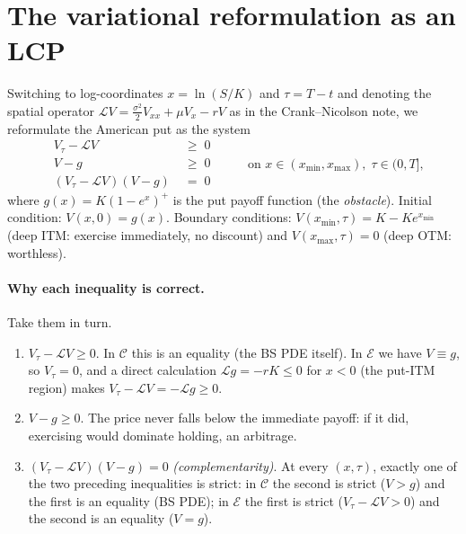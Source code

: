 \documentclass[11pt,a4paper]{article}
\begin{document}
\section{The variational reformulation as an LCP}

Switching to log-coordinates $x = \ln(S/K)$ and $\tau = T - t$ and
denoting the spatial operator
$\mathcal{L}V = \frac{\sigma^2}{2}V_{xx} + \mu V_x - rV$ as in
the Crank--Nicolson note, we reformulate the American put as the system
\begin{equation}
\boxed{\;\;\begin{aligned}
V_\tau - \mathcal{L}V \;&\geq\; 0 \\
V - g \;&\geq\; 0 \\
(V_\tau - \mathcal{L}V)(V - g) \;&=\; 0
\end{aligned}\;\;}
\qquad
\text{on } x \in (x_{\min}, x_{\max}),\; \tau \in (0, T],
\label{eq:lcp-cont}
\end{equation}
where $g(x) = K(1 - e^x)^+$ is the put payoff function (the
\emph{obstacle}). Initial condition: $V(x, 0) = g(x)$. Boundary
conditions: $V(x_{\min}, \tau) = K - K e^{x_{\min}}$ (deep ITM:
exercise immediately, no discount) and
$V(x_{\max}, \tau) = 0$ (deep OTM: worthless).

\paragraph{Why each inequality is correct.} Take them in turn.

\begin{enumerate}[leftmargin=2em]
\item $V_\tau - \mathcal{L}V \geq 0$. In $\mathcal{C}$ this is an
equality (the BS PDE itself). In $\mathcal{E}$ we have $V \equiv g$,
so $V_\tau = 0$, and a direct calculation
$\mathcal{L}g = -rK \leq 0$ for $x < 0$ (the put-ITM region) makes
$V_\tau - \mathcal{L}V = -\mathcal{L}g \geq 0$.

\item $V - g \geq 0$. The price never falls below the immediate
payoff: if it did, exercising would dominate holding, an arbitrage.

\item $(V_\tau - \mathcal{L}V)(V - g) = 0$ \emph{(complementarity)}.
At every $(x, \tau)$, exactly one of the two preceding inequalities
is strict: in $\mathcal{C}$ the second is strict ($V > g$) and the
first is an equality (BS PDE); in $\mathcal{E}$ the first is strict
($V_\tau - \mathcal{L}V > 0$) and the second is an equality
($V = g$).
\end{enumerate}
\end{document}
